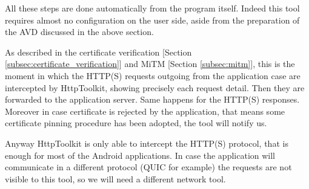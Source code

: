 			\par All these steps are done automatically from the program itself. Indeed this tool requires almost no configuration on the user side, aside from the preparation of the AVD discussed in the above section.
			\par	As described in the certificate verification [Section \ref{subsec:certificate_verification}] and MiTM [Section \ref{subsec:mitm}], this is the moment in which the HTTP(S) requests outgoing from the application case are intercepted by HttpToolkit, showing precisely each request detail. Then they are forwarded to the application server. Same happens for the HTTP(S) responses. Moreover in case certificate is rejected by the application, that means some certificate pinning procedure has been adopted, the tool will notify us.
			\par Anyway HttpToolkit is only able to intercept the HTTP(S) protocol, that is enough for most of the Android applications. In case the application will communicate in a different protocol (QUIC for example) the requests are not visible to this tool, so we will need a different network tool.
		
